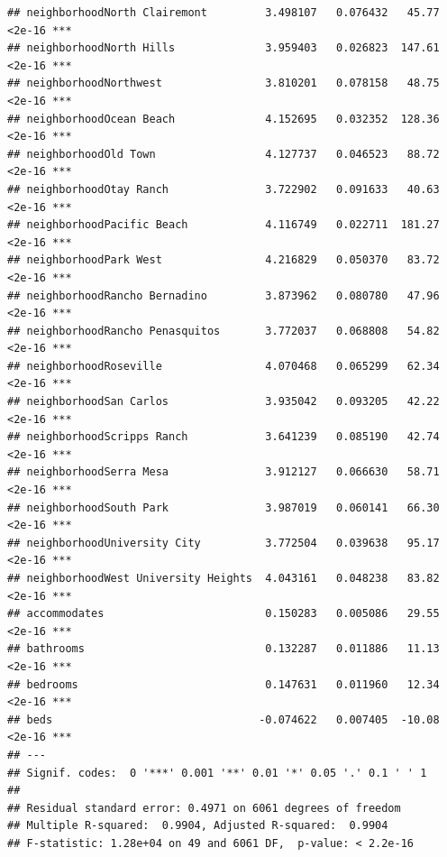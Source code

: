 \documentclass[
]{book}
\begin{document}
\begin{verbatim}
## neighborhoodNorth Clairemont         3.498107   0.076432   45.77   <2e-16 ***
## neighborhoodNorth Hills              3.959403   0.026823  147.61   <2e-16 ***
## neighborhoodNorthwest                3.810201   0.078158   48.75   <2e-16 ***
## neighborhoodOcean Beach              4.152695   0.032352  128.36   <2e-16 ***
## neighborhoodOld Town                 4.127737   0.046523   88.72   <2e-16 ***
## neighborhoodOtay Ranch               3.722902   0.091633   40.63   <2e-16 ***
## neighborhoodPacific Beach            4.116749   0.022711  181.27   <2e-16 ***
## neighborhoodPark West                4.216829   0.050370   83.72   <2e-16 ***
## neighborhoodRancho Bernadino         3.873962   0.080780   47.96   <2e-16 ***
## neighborhoodRancho Penasquitos       3.772037   0.068808   54.82   <2e-16 ***
## neighborhoodRoseville                4.070468   0.065299   62.34   <2e-16 ***
## neighborhoodSan Carlos               3.935042   0.093205   42.22   <2e-16 ***
## neighborhoodScripps Ranch            3.641239   0.085190   42.74   <2e-16 ***
## neighborhoodSerra Mesa               3.912127   0.066630   58.71   <2e-16 ***
## neighborhoodSouth Park               3.987019   0.060141   66.30   <2e-16 ***
## neighborhoodUniversity City          3.772504   0.039638   95.17   <2e-16 ***
## neighborhoodWest University Heights  4.043161   0.048238   83.82   <2e-16 ***
## accommodates                         0.150283   0.005086   29.55   <2e-16 ***
## bathrooms                            0.132287   0.011886   11.13   <2e-16 ***
## bedrooms                             0.147631   0.011960   12.34   <2e-16 ***
## beds                                -0.074622   0.007405  -10.08   <2e-16 ***
## ---
## Signif. codes:  0 '***' 0.001 '**' 0.01 '*' 0.05 '.' 0.1 ' ' 1
## 
## Residual standard error: 0.4971 on 6061 degrees of freedom
## Multiple R-squared:  0.9904, Adjusted R-squared:  0.9904 
## F-statistic: 1.28e+04 on 49 and 6061 DF,  p-value: < 2.2e-16
\end{verbatim}
\end{document}
